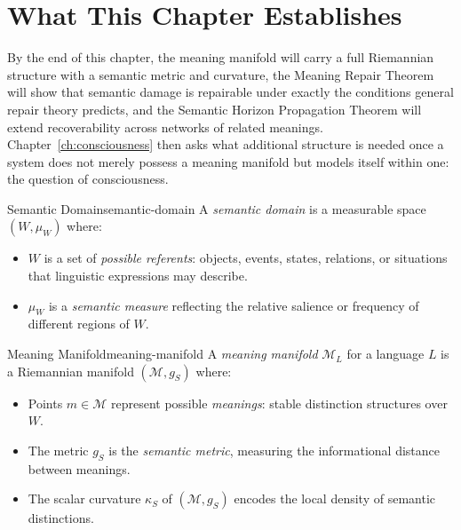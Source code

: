 \documentclass[12pt,twoside,openright]{book}
\begin{document}
\section{What This Chapter Establishes}
\label{sec:ch20-preview}

By the end of this chapter, the meaning manifold will carry a
full Riemannian structure with a semantic metric and
curvature, the Meaning Repair Theorem will show that semantic
damage is repairable under exactly the conditions general
repair theory predicts, and the Semantic Horizon Propagation
Theorem will extend recoverability across networks of related
meanings. Chapter~\ref{ch:consciousness} then asks what
additional structure is needed once a system does not merely
possess a meaning manifold but models itself within one: the
question of consciousness.

\begin{definition}{Semantic Domain}{semantic-domain}
  A \emph{semantic domain} is a measurable space
  $(W, \mu_W)$ where:
  \begin{itemize}[nosep]
    \item $W$ is a set of \emph{possible referents}:
          objects, events, states, relations, or
          situations that linguistic expressions
          may describe.
    \item $\mu_W$ is a \emph{semantic measure}
          reflecting the relative salience or
          frequency of different regions of $W$.
  \end{itemize}
\end{definition}

\begin{definition}{Meaning Manifold}{meaning-manifold}
  A \emph{meaning manifold} $\mathcal{M}_L$ for a
  language $L$ is a Riemannian manifold
  $(\mathcal{M}, g_S)$ where:
  \begin{itemize}[nosep]
    \item Points $m \in \mathcal{M}$ represent possible
          \emph{meanings}: stable distinction structures
          over $W$.
    \item The metric $g_S$ is the \emph{semantic metric},
          measuring the informational distance between
          meanings.
    \item The scalar curvature $\kappa_S$ of
          $(\mathcal{M}, g_S)$ encodes the local
          density of semantic distinctions.
  \end{itemize}
\end{definition}
\end{document}
